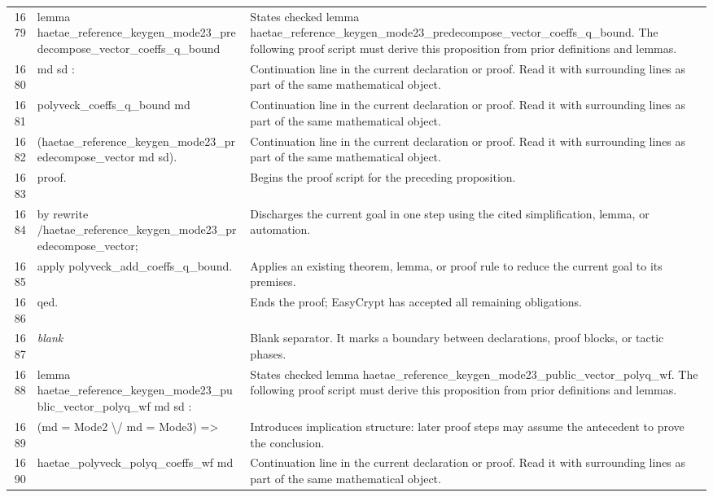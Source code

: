 \documentclass[10pt]{article}
\begin{document}
\begin{longtable}{r L{0.53\textwidth} L{0.37\textwidth}}
1679 & {\ttfamily\scriptsize lemma haetae\_reference\_keygen\_mode23\_predecompose\_vector\_coeffs\_q\_bound} & States checked lemma haetae\_reference\_keygen\_mode23\_predecompose\_vector\_coeffs\_q\_bound.  The following proof script must derive this proposition from prior definitions and lemmas. \\
1680 & {\ttfamily\scriptsize    md sd :} & Continuation line in the current declaration or proof.  Read it with surrounding lines as part of the same mathematical object. \\
1681 & {\ttfamily\scriptsize   polyveck\_coeffs\_q\_bound md} & Continuation line in the current declaration or proof.  Read it with surrounding lines as part of the same mathematical object. \\
1682 & {\ttfamily\scriptsize     (haetae\_reference\_keygen\_mode23\_predecompose\_vector md sd).} & Continuation line in the current declaration or proof.  Read it with surrounding lines as part of the same mathematical object. \\
1683 & {\ttfamily\scriptsize proof.} & Begins the proof script for the preceding proposition. \\
1684 & {\ttfamily\scriptsize by rewrite /haetae\_reference\_keygen\_mode23\_predecompose\_vector;} & Discharges the current goal in one step using the cited simplification, lemma, or automation. \\
1685 & {\ttfamily\scriptsize    apply polyveck\_add\_coeffs\_q\_bound.} & Applies an existing theorem, lemma, or proof rule to reduce the current goal to its premises. \\
1686 & {\ttfamily\scriptsize qed.} & Ends the proof; EasyCrypt has accepted all remaining obligations. \\
1687 & {\ttfamily\scriptsize \emph{blank}} & Blank separator.  It marks a boundary between declarations, proof blocks, or tactic phases. \\
1688 & {\ttfamily\scriptsize lemma haetae\_reference\_keygen\_mode23\_public\_vector\_polyq\_wf md sd :} & States checked lemma haetae\_reference\_keygen\_mode23\_public\_vector\_polyq\_wf.  The following proof script must derive this proposition from prior definitions and lemmas. \\
1689 & {\ttfamily\scriptsize   (md = Mode2 \textbackslash{}/ md = Mode3) =>} & Introduces implication structure: later proof steps may assume the antecedent to prove the conclusion. \\
1690 & {\ttfamily\scriptsize   haetae\_polyveck\_polyq\_coeffs\_wf md} & Continuation line in the current declaration or proof.  Read it with surrounding lines as part of the same mathematical object. \\

\end{longtable}
\end{document}
